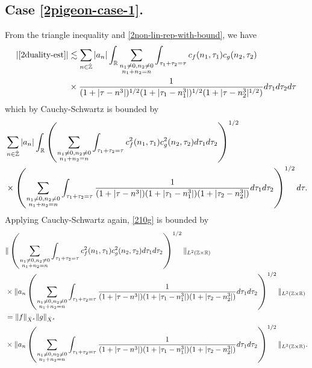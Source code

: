 \subsection{Case \ref{2pigeon-case-1}.} From the triangle inequality and \eqref{2non-lin-rep-with-bound}, we have
%
%
\begin{equation*}
	\begin{split}
	 |\eqref{2duality-est}|
	& \lesssim \sum_{n \in \dot{\mathbb{Z}}} |a_{n}| \int_{\mathbb{R}} \sum_{\substack{n_1 \neq 0, n_2 \neq 0
		\\ n_1 +n_2 =n}} \int_{\tau_1 + \tau_2 = \tau} c_f(n_1, \tau_1)
		c_g(n_2, \tau_2)
		\\
		& \times \frac{1}{(1 + | \tau - n^{3} |)^{1/2}(1 + |
		\tau_{1}-n_{1}^{3} |)^{1/2}(1 + | \tau-n_{2}^{3} |^{1/2})} d \tau_1 d \tau_2
		d \tau
	\end{split}
\end{equation*}
%
%
which by Cauchy-Schwartz is bounded by
%
%
\begin{equation}
	\label{210g}
	\begin{split}
		& \sum_{n \in \dot{\mathbb{Z}}} |a_n| \int_{\mathbb{R}} \left(  \sum_{\substack{n_1 \neq 0, n_2
		\neq 0 \\n_1 +n_2 =n}} \int_{\tau_1 + \tau_2 = \tau} c_{f}^{2}(n_1, \tau_1)
		c_{g}^{2} (n_2, \tau_2) d \tau_1 d \tau_2 \right)^{1/2} 
		\\
		& \times \left( \sum_{\substack{n_1 \neq 0, n_2 \neq 0 \\n_1 +n_2 =n}}
		\int_{\tau_1 + \tau_2 = \tau} \frac{1}{(1 + | \tau - n^{3} |)(1 + | \tau_{1}-n_{1}^{3} |)(1 + |
		\tau_2 -n_{2}^{3} |)} d \tau_1 d \tau_2
		\right)^{1/2} d \tau.
	\end{split}
\end{equation}
%
%
Applying Cauchy-Schwartz again, \eqref{210g} is bounded by
%
%
\begin{align}
	\notag
		& \|\left( \sum_{\substack{n_1 \neq 0, n_2 \neq 0 \\n_1 +n_2 =n}}\int_{\tau_1 + \tau_2 = \tau} c_{f}^{2}(n_1, \tau_1)
		c_{g}^{2} (n_2, \tau_2) d \tau_1 d \tau_2 \right)^{1/2} \|_{L^{2}(\mathbb{Z} \times
		\mathbb{R})}
		\\
		\notag
		& \times  \|a_{n}
		\left( \sum_{\substack{n_1 \neq 0, n_2 \neq 0 \\n_1 +n_2
		=n}}\int_{\tau_1 + \tau_2 = \tau} \frac{1}{(1 + | \tau - n^{3} |)(1 + |
		\tau_{1}-n_{1}^{3} |)(1 + | \tau_2 -n_{2}^{3} |)} d \tau_1 d \tau_2
		\right)^{1/2} \|_{L^2(\mathbb{Z} \times \mathbb{R})}
		\\
		\notag
		& = \|f\|_{\dot{X}^s} \|g\|_{\dot{X}^s}
		\\
		\label{2holder-term}
		& \times 
		\|a_{n}
		\left( \sum_{\substack{n_1 \neq 0, n_2 \neq 0 \\n_1 +n_2
		=n}}\int_{\tau_1 + \tau_2 = \tau} \frac{1}{(1 + | \tau - n^{3} |)(1 + |
		\tau_{1}-n_{1}^{3} |)(1 + | \tau_2 -n_{2}^{3} |)} d \tau_1 d \tau_2
		\right)^{1/2} \|_{L^2(\mathbb{Z} \times \mathbb{R})}.
\end{align}
